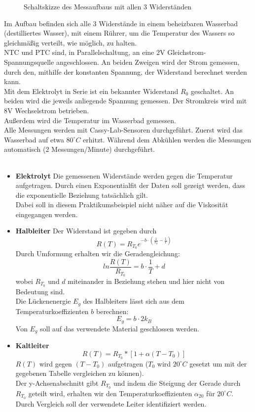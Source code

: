 \documentclass[12pt,a4paper]{article}
\begin{document}
\begin{multicols}{2}
\begin{figure}[H]
	\caption{Schaltskizze des Messaufbaus mit allen 3 Widerständen}
	\label{fig:schaltskizze_temp-widerst}
\end{figure}

Im Aufbau befinden sich alle 3 Widerstände in einem beheizbaren Wasserbad (destilliertes Wasser), mit einem Rührer, um die Temperatur des Wassers so gleichmäßig verteilt, wie möglich, zu halten.\\
NTC und PTC sind, in Parallelschaltung,  an eine 2V Gleichstrom-Spannungsquelle angeschlossen. An beiden Zweigen wird der Strom gemessen, durch den, mithilfe der konstanten Spannung, der Widerstand berechnet werden kann.\\
Mit dem Elektrolyt in Serie ist ein bekannter Widerstand $R_0$ geschaltet. An beiden wird die jeweils anliegende Spannung gemessen. Der Stromkreis wird mit 8V Wechselstrom betrieben.\\
Außerdem wird die Temperatur im Wasserbad gemessen.\\
Alle Messungen werden mit Cassy-Lab-Sensoren durchgeführt. Zuerst wird das Wasserbad auf etwa $80^\circ C$ erhitzt. Während dem Abkühlen werden die Messungen automatisch (2 Messungen/Minute) durchgeführt.\\
\\
\begin{itemize}
	\item \textbf{Elektrolyt}
	Die gemessenen Widerstände werden gegen die Temperatur aufgetragen. Durch einen Exponentialfit der Daten soll gezeigt werden, dass die exponentielle Beziehung tatsächlich gilt.\\
	Dabei soll in diesem Praktikumsbeispiel nicht näher auf die Viskosität eingegangen werden.
	
	\item \textbf{Halbleiter}
	Der Widerstand ist gegeben durch
	$$R(T)=R_{T_0}e^{-b\cdot (\frac{1}{T_0}- \frac{1}{T})}$$
	Durch Umformung erhalten wir die Geradengleichung:
	$$ln{\frac{R(T)}{R_{T_0}}}=b\cdot \frac{1}{T} + d$$
	wobei $R_{T_0}$ und $d$ miteinander in Beziehung stehen und hier nicht von Bedeutung sind.\\
	Die Lückenenergie $E_g$ des Halbleiters lässt sich aus dem Temperaturkoeffizienten $b$ berechnen:
	$$E_g = b \cdot 2k_B$$
	Von $E_g$ soll auf das verwendete Material geschlossen werden.
	
	\item \textbf{Kaltleiter}
	$$R(T) = R_{T_0} * [1+ \alpha (T - T_0)]$$
	$R(T)$ wird gegen $(T-T_0)$ aufgetragen ($T_0$ wird $20^\circ C$ gesetzt um mit der gegebenen Tabelle vergleichen zu können). \\
	Der y-Achsenabschnitt gibt $R_{T_0}$ und indem die Steigung der Gerade durch $R_{T_0}$ geteilt wird, erhalten wir den Temperaturkoeffizienten $\alpha_{20}$ für $20^\circ C$.\\
	Durch Vergleich soll der verwendete Leiter identifiziert werden.\\
	\\
		
\end{itemize}

\end{multicols}
\end{document}
